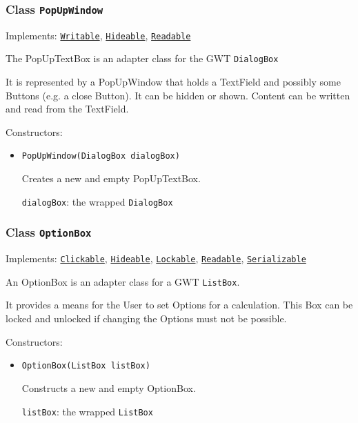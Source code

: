 \subsubsection{Class \texttt{PopUpWindow}}
\label{type:edu.kit.wavelength.client.view.webui.component.PopUpWindow}
Implements: \texttt{\hyperref[type:edu.kit.wavelength.client.view.api.Writable]{Writable}}, \texttt{\hyperref[type:edu.kit.wavelength.client.view.api.Hideable]{Hideable}}, \texttt{\hyperref[type:edu.kit.wavelength.client.view.api.Readable]{Readable}}

The PopUpTextBox is an adapter class for the GWT \texttt{DialogBox}
 
 It is represented by a PopUpWindow that holds a TextField and possibly some
 Buttons (e.g. a close Button). It can be hidden or shown. Content can be written and read from the
 TextField.

Constructors:
\begin{itemize}
\item \texttt{PopUpWindow(DialogBox dialogBox)}

Creates a new and empty PopUpTextBox.

\texttt{dialogBox}: the wrapped \texttt{DialogBox}

\end{itemize}

\subsubsection{Class \texttt{OptionBox}}
\label{type:edu.kit.wavelength.client.view.webui.component.OptionBox}
Implements: \texttt{\hyperref[type:edu.kit.wavelength.client.view.api.Clickable]{Clickable}}, \texttt{\hyperref[type:edu.kit.wavelength.client.view.api.Hideable]{Hideable}}, \texttt{\hyperref[type:edu.kit.wavelength.client.view.api.Lockable]{Lockable}}, \texttt{\hyperref[type:edu.kit.wavelength.client.view.api.Readable]{Readable}}, \texttt{\hyperref[type:edu.kit.wavelength.client.model.serialization.Serializable]{Serializable}}

An OptionBox is an adapter class for a GWT \texttt{ListBox}.
 
 It provides a means for the User to set Options for a calculation. This Box
 can be locked and unlocked if changing the Options must not be possible.

Constructors:
\begin{itemize}
\item \texttt{OptionBox(ListBox listBox)}

Constructs a new and empty OptionBox.

\texttt{listBox}: the wrapped \texttt{ListBox}

\end{itemize}

